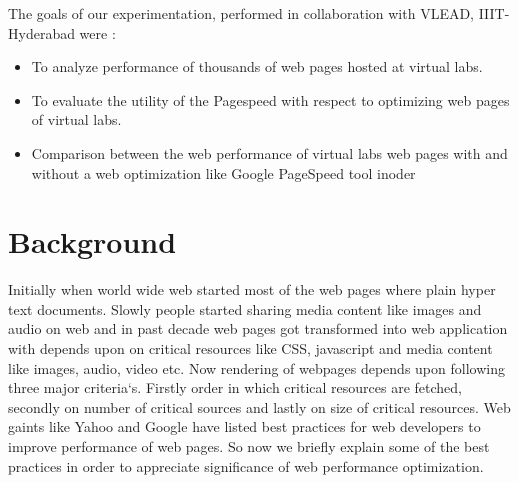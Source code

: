 \documentclass[conference]{IEEEtran}
\begin{document}
The goals of our experimentation, performed in collaboration with VLEAD,
IIIT-Hyderabad were :

\begin{itemize}
\item To analyze performance of thousands of web pages hosted at virtual labs.
\item To evaluate the utility of the Pagespeed with respect to optimizing web pages of virtual labs.
\item Comparison between the web performance of virtual labs web pages with
and without a web optimization like Google PageSpeed tool inoder
\end{itemize}

\section{Background}\label{sec-3}
Initially when world wide web started most of the web pages where plain hyper text documents.
Slowly people started sharing media content like images and audio on web and in past decade
web pages got transformed into web application with depends upon on critical resources
like CSS, javascript and media content like images, audio, video etc. Now rendering of webpages depends upon
following three major criteria`s. Firstly order in which critical resources are fetched, secondly on
number of critical sources and lastly on size of critical resources. Web gaints like Yahoo and Google
have listed best practices for web developers to improve performance of web pages. So now we briefly
explain some of the best practices in order to appreciate significance of web performance optimization.
\end{document}
